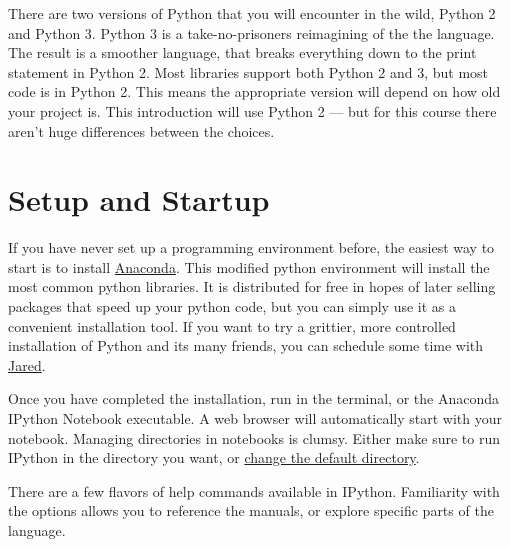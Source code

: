 \documentclass[justified, nobib]{tufte-handout}
\makeatletter
\newcommand{\anacondaLink}{https://store.continuum.io/cshop/anaconda/}
\newcommand{\email}{mailto:jgarst@ucdavis.edu}
\newcommand{\customizeDirectoryLink}
  {http://stackoverflow.com/questions/15680463/change-ipython-working-directory}
\makeatother
\begin{document}
\smallskip
\noindent
There are two versions of Python that you will encounter in the wild, Python 2
and Python 3. Python 3 is a take-no-prisoners reimagining of the the
language.
The result is a smoother language, that breaks everything down to the print
statement in Python 2.
Most libraries support both Python 2 and 3, but most code is in Python 2.
This means the appropriate version will depend on how old your project is.
This introduction will use Python 2 --- but for this course there aren't huge
differences between the choices.

\section*{Setup and Startup}
If you have never set up a programming environment before, the easiest way to
start is to install \href{\anacondaLink}{Anaconda}.
This modified python environment will install the most common python libraries.
It is distributed for free in hopes of later selling packages that speed up
your python code, but you can simply use it as a convenient installation tool.
If you want to try a grittier, more controlled installation of Python and its
many friends, you can schedule some time with \href{\email}{Jared}.

\smallskip
\noindent
Once you have completed the installation, run  in
the terminal, or the Anaconda IPython Notebook executable.
A web browser will automatically start with your notebook.
Managing directories in notebooks is clumsy.
Either make sure to run IPython in the directory you want, or
\href{\customizeDirectoryLink}{change the default directory}.

\smallskip
\noindent
There are a few flavors of help commands available in IPython. Familiarity with
the options allows you to reference the manuals, or explore specific parts of
the language.

\end{document}
